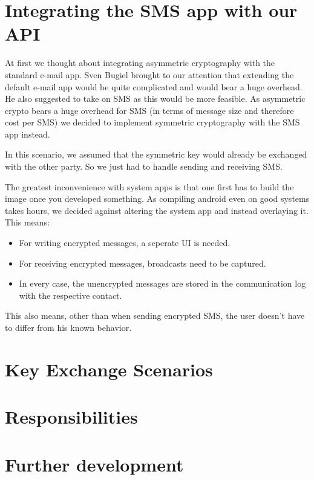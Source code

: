 \documentclass[a4paper,draft]{scrartcl}
\begin{document}
\section{Integrating the SMS app with our API}
	\label{sec-sms-app}
	At first we thought about integrating asymmetric cryptography with the standard e-mail app. Sven Bugiel brought to our attention that extending the default e-mail app would be quite complicated and would bear a huge overhead. He also suggested to take on SMS as this would be more feasible. As asymmetric crypto bears a huge overhead for SMS (in terms of message size and therefore cost per SMS) we decided to implement symmetric cryptography with the SMS app instead. %
	
	In this scenario, we assumed that the symmetric key would already be exchanged with the other party. So we just had to handle sending and receiving SMS.
	
	The greatest inconvenience with system apps is that one first has to build the image once you developed something. As compiling android even on good systems takes hours, we decided against altering the system app and instead overlaying it. This means:
	\begin{itemize}
		\item For writing encrypted messages, a seperate UI is needed.
		\item For receiving encrypted messages, broadcasts need to be captured.
		\item In every case, the unencrypted messages are stored in the communication log with the respective contact.
	\end{itemize}
	This also means, other than when sending encrypted SMS, the user doesn't have to differ from his known behavior.
	
\section{Key Exchange Scenarios}
	
\section{Responsibilities}
	
\section{Further development}
\end{document}
